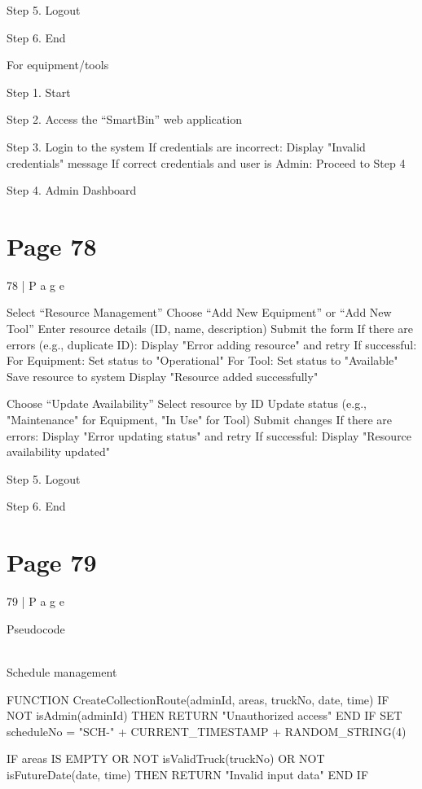 \documentclass{article}
\begin{document}
Step 5. Logout 
  
Step 6. End 
 
 
For equipment/tools 
 
 
Step 1. Start 
  
Step 2. Access the “SmartBin” web application 
  
Step 3. Login to the system 
    If credentials are incorrect: Display "Invalid credentials" message 
    If correct credentials and user is Admin: Proceed to Step 4 
  
Step 4. Admin Dashboard 

\section*{Page 78}
78 | P a g e 
 
    Select “Resource Management” 
    Choose “Add New Equipment” or “Add New Tool” 
    Enter resource details (ID, name, description) 
    Submit the form 
    If there are errors (e.g., duplicate ID): Display "Error adding resource" and retry 
    If successful: 
        For Equipment: Set status to "Operational" 
        For Tool: Set status to "Available" 
        Save resource to system 
        Display "Resource added successfully" 
  
    Choose “Update Availability” 
    Select resource by ID 
    Update status (e.g., "Maintenance" for Equipment, "In Use" for Tool) 
    Submit changes 
    If there are errors: Display "Error updating status" and retry 
    If successful: Display "Resource availability updated" 
  
Step 5. Logout 
  
Step 6. End 
 
 
 

\section*{Page 79}
79 | P a g e 
 
Pseudocode 
 
 
 
\\Schedule management 
 
 
FUNCTION CreateCollectionRoute(adminId, areas, truckNo, date, time) IF NOT 
isAdmin(adminId) THEN RETURN "Unauthorized access" END IF 
SET scheduleNo = "SCH-" + CURRENT\_TIMESTAMP + RANDOM\_STRING(4) 
 
IF areas IS EMPTY OR NOT isValidTruck(truckNo) OR NOT 
isFutureDate(date, time) THEN 
    RETURN "Invalid input data" 
END IF 
 
\end{document}
